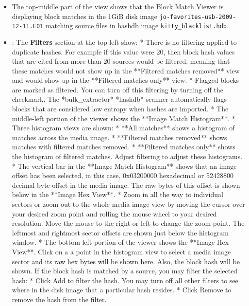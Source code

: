 \documentclass[11pt,fleqn]{article} %
\begin{document}
\begin{itemize}
\item The top-middle part of the view shows that the Block Match Viewer is displaying block matches in the 1GiB disk image \verb+jo-favorites-usb-2009-12-11.E01+ matching source files in hashdb image \verb+kitty_blacklist.hdb+.
\item: The \textbf{Filters} section at the top-left show:
  * There is no filtering applied to duplicate hashes.  For example if this value were 20, then block hash values that are cited from more than 20 sources would be filtered, meaning that these matches would not show up in the **Filtered matches removed** view and would show up in the **Filtered matches only** view.
  * Flagged blocks are marked as filtered.  You can turn off this filtering by turning off the checkmark.  The *bulk_extractor* *hashdb* scanner automatically flags blocks that are considered low entropy when hashes are imported.
* The middle-left portion of the viewer shows the **Image Match Histogram**.
  * Three histogram views are shown:
    * **All matches** shows a histogram of matches across the media image.
    * **Filtered matches removed** shows matches with filtered matches removed.
    * **Filtered matches only** shows the histogram of filtered matches.  Adjust filtering to adjust these histograms.
  * The vertical bar in the **Image Match Histogram** shows that an image offset has been selected, in this case, 0x03200000 hexadecimal or 52428800 decimal byte offset in the media image.  The raw bytes of this offset is shown below in the **Image Hex View**.
  * Zoom in all the way to individual sectors or zoom out to the whole media image view by moving the cursor over your desired zoom point and rolling the mouse wheel to your desired resolution.  Move the mouse to the right or left to change the zoom point.  The leftmost and rightmost sector offsets are shown just below the histogram window.
* The bottom-left portion of the viewer shows the **Image Hex View**.  Click on a a point in the histogram view to select a media image sector and its raw hex bytes will be shown here.  Also, the block hash will be shown.  If the block hash is matched by a source, you may filter the selected hash:
  * Click Add to filter the hash.  You may turn off all other filters to see where in the disk image that a particular hash resides.
  * Click Remove to remove the hash from the filter.


\end{itemize}
\end{document}

